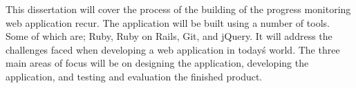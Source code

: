 This dissertation will cover the process of the building of the progress monitoring web application recur. The application will be built using a number of tools. Some of which are; Ruby, Ruby on Rails, Git, and jQuery. It will address the challenges faced when developing a web application in today\'s world. The three main areas of focus will be on designing the application, developing the application, and testing and evaluation the finished product.\\